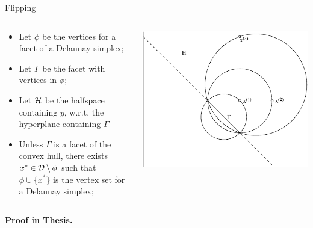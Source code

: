 \documentclass[xcolor=dvipsnames]{beamer}
\begin{document}
\begin{frame}{Flipping}
\begin{columns}
\begin{column}{.58\textwidth}
\begin{itemize}
\item Let $\phi$ be the vertices for a facet of a Delaunay simplex;
\item Let $\Gamma$ be the facet with vertices in $\phi$;
\item Let ${\cal H}$ be the halfspace containing $y$,
w.r.t. the hyperplane containing $\Gamma$
\item Unless $\Gamma$ is a facet of the convex hull, there exists
$x^* \in {\cal D} \setminus \phi$ such that $\phi \cup \{x^*\}$
is the vertex set for a Delaunay simplex;
\end{itemize}
\end{column}
\begin{column}{.4\textwidth}
\includegraphics[width=\textwidth]{circles.eps}
\end{column}
\end{columns}
\medskip
\centerline{\bf Proof in Thesis.}
\end{frame}
\end{document}
